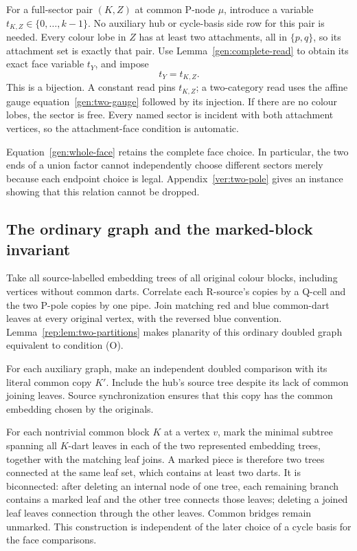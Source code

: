 For a full-sector pair $(K,Z)$ at common P-node $\mu$, introduce a variable
$t_{K,Z}\in\{0,\ldots,k-1\}$.  No auxiliary hub or cycle-basis side row
for this pair is needed.  Every colour lobe in $Z$ has at least two
attachments, all in $\{p,q\}$, so its attachment set is exactly that
pair.  Use Lemma~\ref{gen:complete-read} to obtain its exact face variable
$t_Y$, and impose
\begin{equation}
                    t_Y=t_{K,Z}.
 \label{gen:whole-face}
\end{equation}
This is a bijection.  A constant read pins $t_{K,Z}$; a two-category read
uses the affine gauge equation~\eqref{gen:two-gauge} followed by its
injection.  If there are no colour lobes, the sector is free.  Every named
sector is incident with both attachment vertices, so the attachment-face
condition is automatic.

Equation~\eqref{gen:whole-face} retains the complete face choice.  In
particular, the two ends of a union factor cannot independently choose
different sectors merely because each endpoint choice is legal.
Appendix~\ref{ver:two-pole} gives an instance showing that this relation
cannot be dropped.

\subsection{The ordinary graph and the marked-block invariant}
\label{gen:marking}

Take all source-labelled embedding trees of all original colour blocks,
including vertices without common darts.  Correlate each R-source's
copies by a Q-cell and the two P-pole copies by one pipe.  Join matching
red and blue common-dart leaves at every original vertex, with the reversed
blue convention.  Lemma~\ref{rep:lem:two-partitions} makes planarity of this
ordinary doubled graph equivalent to condition (O).

For each auxiliary graph, make an independent doubled comparison with
its literal common copy $K'$.  Include the hub's source tree despite its
lack of common joining leaves.  Source synchronization ensures that this
copy has the common embedding chosen by the originals.

For each nontrivial common block $K$ at a vertex $v$, mark the
minimal subtree spanning all $K$-dart leaves in each of the two
represented embedding trees, together with the matching leaf joins.
A marked piece is therefore two trees connected at the same leaf set,
which contains at least two darts.  It is biconnected: after deleting
an internal node of one tree, each remaining branch contains a marked
leaf and the other tree connects those leaves; deleting a joined leaf
leaves connection through the other leaves.  Common bridges remain
unmarked.  This construction is independent of the later choice of a
cycle basis for the face comparisons.

